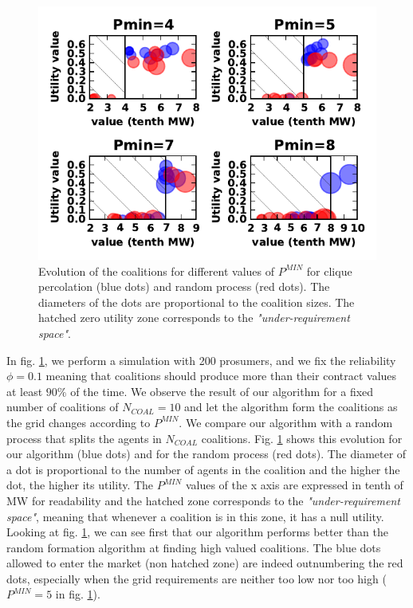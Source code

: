 \documentclass[conference]{IEEEtran}
\begin{document}
\begin{figure}[htbp]
  \centering
  \includegraphics[scale=0.9]{./figure5/coals}
  \caption{Evolution of the coalitions for different values of $ P^{MIN} $ for clique percolation (blue dots) and random process (red dots). The diameters of the dots are proportional to the coalition sizes. The hatched zero utility zone corresponds to the \textit{"under-requirement space"}.}
  \label{Fig3}
\end{figure}

In fig. \ref{Fig3}, we perform a simulation with 200 prosumers, and we fix the reliability $ \phi = 0.1 $ meaning that coalitions should produce more than their contract values at least $ 90 \% $ of the time. We observe the result of our algorithm for a fixed number of coalitions of $N_{COAL} = 10$ and let the algorithm form the coalitions as the grid changes according to $ P^{MIN} $. We compare our algorithm with a random process that splits the agents in $ N_{COAL} $ coalitions. Fig. \ref{Fig3} shows this evolution for our algorithm (blue dots) and for the random process (red dots). The diameter of a dot is proportional to the number of agents in the coalition and the higher the dot, the higher its utility. The $ P^{MIN} $ values of the x axis are expressed in tenth of MW for readability and the hatched zone corresponds to the \textit{"under-requirement space"}, meaning that whenever a coalition is in this zone, it has a null utility. Looking at fig. \ref{Fig3}, we can see first that our algorithm performs better than the random formation algorithm at finding high valued coalitions. The blue dots allowed to enter the market (non hatched zone) are indeed outnumbering the red dots, especially when the grid requirements are neither too low nor too high ($ P^{MIN} = 5 $ in fig. \ref{Fig3}).
\end{document}
